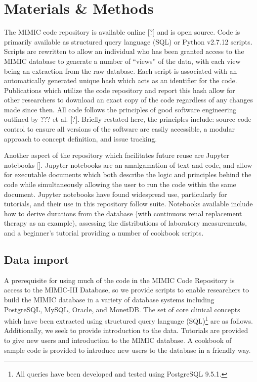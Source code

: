 \documentclass{elsart}
\begin{document}
\section{Materials & Methods}




The MIMIC code repository is available online [?] and is open source. Code is primarily available as structured query language (SQL) or Python v2.7.12 scripts. Scripts are rewritten to allow an individual who has been granted access to the MIMIC database to generate a number of ``views'' of the data, with each view being an extraction from the raw database. Each script is associated with an automatically generated unique hash which acts as an identifier for the code. Publications which utilize the code repository and report this hash allow for other researchers to download an exact copy of the code regardless of any changes made since then. All code follows the principles of good software engineering outlined by ??? et al. [?]. Briefly restated here, the principles include: source code control to ensure all versions of the software are easily accessible, a modular approach to concept definition, and issue tracking. %

Another aspect of the repository which facilitates future reuse are Jupyter notebooks []. Jupyter notebooks are an amalgamation of text and code, and allow for executable documents which both describe the logic and principles behind the code while simultaneously allowing the user to run the code within the same document. Jupyter notebooks have found widespread use, particularly for tutorials, and their use in this repository follow suite. Notebooks available include how to derive durations from the database (with continuous renal replacement therapy as an example), assessing the distributions of laboratory measurements, and a beginner's tutorial providing a number of cookbook scripts.

\subsection{Data import}

A prerequisite for using much of the code in the MIMIC Code Repository is access to the MIMIC-III Database, so we provide scripts to enable researchers to build the MIMIC database in a variety of database systems including PostgreSQL, MySQL, Oracle, and MonetDB. The set of core clinical concepts which have been extracted using structured query language (SQL)\footnote{All queries have been developed and tested using PostgreSQL 9.5.1.} are as follows. Additionally, we seek to provide introduction to the data. Tutorials are provided to give new users and introduction to the MIMIC database. A cookbook of sample code is provided to introduce new users to the database in a friendly way.
\end{document}
